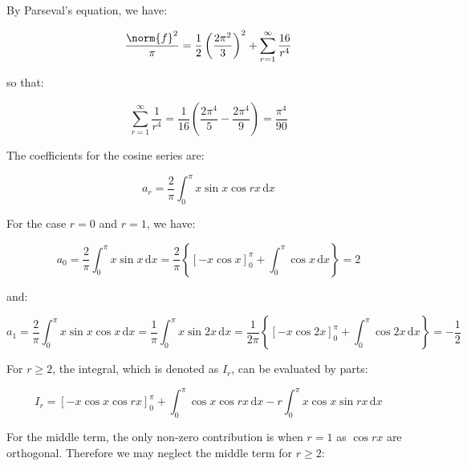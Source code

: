\documentclass[12pt]{article}
\begin{document}
\begin{correction}
    By Parseval's equation, we have:

    \begin{equation}
        \frac{\norm{f}^{2}}{\pi} = \frac{1}{2} \left( \frac{2\pi^{2}}{3} \right)^{2} + \sum_{r = 1}^{\infty} \frac{16}{r^{4}}
    \end{equation}

    so that:

    \begin{equation}
        \sum_{r = 1}^{\infty} \frac{1}{r^{4}} = \frac{1}{16} \left( \frac{2\pi^{4}}{5} - \frac{2\pi^{4}}{9} \right) = \frac{\pi^{4}}{90}
    \end{equation}
\end{correction}


The coefficients for the cosine series are:

\begin{equation}
    a_{r} = \frac{2}{\pi} \int_{0}^{\pi} x \sin{x} \cos{rx} \, \mathrm{d}x
\end{equation}

For the case $r = 0$ and $r = 1$, we have:

\begin{equation}
    a_{0} = \frac{2}{\pi} \int_{0}^{\pi} x \sin{x} \, \mathrm{d}x = \frac{2}{\pi} \left\{ \left[ -x \cos{x} \right]_{0}^{\pi} + \int_{0}^{\pi} \cos{x} \, \mathrm{d}x \right\} = 2
\end{equation}

and:

\begin{equation}
    a_{1} = \frac{2}{\pi} \int_{0}^{\pi} x \sin{x} \cos{x} \, \mathrm{d}x = \frac{1}{\pi} \int_{0}^{\pi} x \sin{2x} \, \mathrm{d}x = \frac{1}{2\pi} \left\{ \left[ -x \cos{2x} \right]_{0}^{\pi} + \int_{0}^{\pi} \cos{2x} \, \mathrm{d}x \right\} = -\frac{1}{2}
\end{equation}

For $r \ge 2$, the integral, which is denoted as $I_{r}$, can be evaluated by parts:

\begin{equation}
    I_{r} = \left[ -x \cos{x} \cos{rx} \right]_{0}^{\pi} + \int_{0}^{\pi} \cos{x} \cos{rx} \, \mathrm{d}x - r \int_{0}^{\pi} x \cos{x} \sin{rx} \, \mathrm{d}x
\end{equation}

For the middle term, the only non-zero contribution is when $r = 1$ as $\cos{rx}$ are orthogonal. Therefore we may neglect the middle term for $r \ge 2$:
\end{document}
